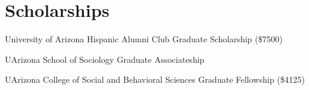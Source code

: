 
\section*{Scholarships}

 University of Arizona Hispanic Alumni Club Graduate Scholarship (\$7500)

 UArizona School of Sociology Graduate Associateship 

 UArizona College of Social and Behavioral Sciences Graduate Fellowship (\$4125)

\begin{comment}
\years{2016-2017} School of Social Sciences and Philosophy Studentship Award (\€6500),\\
\desc{Trinity College, Dublin}
\end{comment}